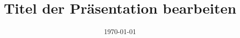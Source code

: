 %
% 
% 
%






\renewcommand{\PersonTitel}{}
\newcommand{\Datum}{\today}

\usepackage{tikz}
\usetikzlibrary{decorations.pathreplacing}
\usetikzlibrary{angles, quotes}
\usetikzlibrary{shapes,arrows, positioning, calc} 
\usepackage{amssymb}

\usepackage{fancyvrb}

\usepackage{blindtext}
\usepackage{listings}

\newlength\myindent
\setlength\myindent{2em}

\renewcommand{\PraesentationFusszeileZusatz}{}%

\title{Titel der Präsentation bearbeiten}
\author{\PersonVornameAl{} \PersonNachnameHo{} \and
	\PersonVornameJa{} \PersonNachnameHa{} \and
	\PersonVornameJo{} \PersonNachnameRi{} }
\institute[]{\UniversitaetName \\ \FakultaetName \\ \LehrstuhlName}
\date[\Datum]{\today}%
\subject{Thema der Präsentation}




